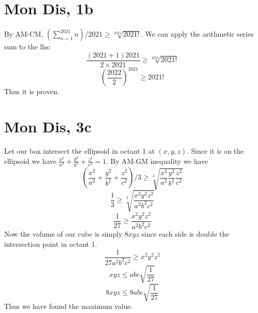\documentclass[12pt]{article}
\begin{document}
\section{Mon Dis, 1b}
By AM-CM, $(\sum_{n=1}^{2021} n) /2021 \geq \sqrt[2021]{2021!}$. We can apply the arithmetic series sum to the lhs:
$$\frac{(2021+1)2021}{2 \times 2021} \geq \sqrt[2021]{2021!}$$
$$(\frac{2022}{2}) ^ {2021} \geq 2021!$$
Thus it is proven.


\section{Mon Dis, 3c}
Let our box intersect the ellipsoid in octant 1 at $(x,y,z)$. Since it is on the ellipsoid we have $\frac{x^2}{a^2}+\frac{y^2}{b^2}+\frac{z^2}{c^2}=1$.
\newline
By AM-GM inequality we have $$(\frac{x^2}{a^2}+\frac{y^2}{b^2}+\frac{z^2}{c^2})/3 \geq \sqrt[3]{\frac{x^2}{a^2}\frac{y^2}{b^2}\frac{z^2}{c^2}}$$
$$\frac{1}{3} \geq \sqrt[3]{\frac{x^2y^2z^2}{a^2b^2c^2}}$$
$$\frac{1}{27} \geq \frac{x^2y^2z^2}{a^2b^2c^2}$$
Now the volume of our cube is simply $8xyz$ since each side is double the intersection point in octant 1.
$$\frac{1}{27a^2b^2c^2} \geq x^2y^2z^2$$
$$xyz \leq abc\sqrt{\frac{1}{27}}$$
$$8xyz \leq 8abc\sqrt{\frac{1}{27}}$$
Thus we have found the maximum value.
\end{document}
